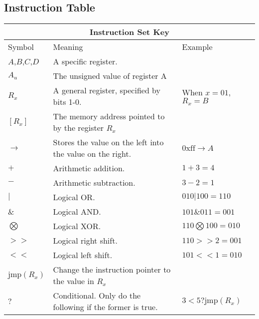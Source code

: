 \documentclass[11pt]{article}
\begin{document}
\subsection{Instruction Table}
\begin{tabular}{|l | l | l|}
\hline
\multicolumn{3}{|c|}{ \textbf{Instruction Set Key}} \\
\hline
Symbol & Meaning & Example\\
\hline
$A$,$B$,$C$,$D$ & A specific register.\\
$A_u$ & The unsigned value of register A & \\
$R_x$ & A general register, specified by bits 1-0. & When $x=01$, $R_x = B$\\
$[R_x]$ & The memory address pointed to by the register $R_x$ &\\
$\rightarrow$ & Stores the value on the left into the value on the right. & $\mathrm{0xff} \rightarrow A$\\
$+$ & Arithmetic addition. & $1 + 3 = 4$\\
$-$ & Arithmetic subtraction. & $3 - 2 = 1$\\
$|$ & Logical OR. & $010 | 100 = 110$\\
$\&$ & Logical AND. & $101 \& 011 = 001$\\
$\bigotimes$ & Logical XOR. & $110 \bigotimes 100 = 010$\\
$>>$ & Logical right shift.& $110 >> 2 = 001$\\
$<<$ & Logical left shift. & $101 << 1 = 010$\\
$\mathrm{jmp}(R_x)$ & Change the instruction pointer to the value in $R_x$&\\
$?$ & Conditional. Only do the following if the former is true.& $3 < 5 ? \mathrm{jmp}(R_x)$\\
\hline
\end{tabular}
\\ \\ \\
\end{document}
